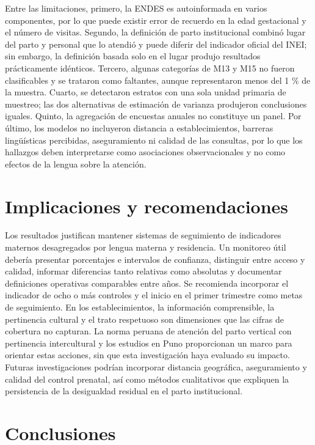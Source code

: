 \documentclass[
  spanish,
  letterpaper,
  conference]{IEEEtran}
\begin{document}
Entre las limitaciones, primero, la ENDES es autoinformada en varios
componentes, por lo que puede existir error de recuerdo en la edad
gestacional y el número de visitas. Segundo, la definición de parto
institucional combinó lugar del parto y personal que lo atendió y puede
diferir del indicador oficial del INEI; sin embargo, la definición
basada solo en el lugar produjo resultados prácticamente idénticos.
Tercero, algunas categorías de M13 y M15 no fueron clasificables y se
trataron como faltantes, aunque representaron menos del 1 \% de la
muestra. Cuarto, se detectaron estratos con una sola unidad primaria de
muestreo; las dos alternativas de estimación de varianza produjeron
conclusiones iguales. Quinto, la agregación de encuestas anuales no
constituye un panel. Por último, los modelos no incluyeron distancia a
establecimientos, barreras lingüísticas percibidas, aseguramiento ni
calidad de las consultas, por lo que los hallazgos deben interpretarse
como asociaciones observacionales y no como efectos de la lengua sobre
la atención.

\section{Implicaciones y
recomendaciones}\label{implicaciones-y-recomendaciones}

Los resultados justifican mantener sistemas de seguimiento de
indicadores maternos desagregados por lengua materna y residencia. Un
monitoreo útil debería presentar porcentajes e intervalos de confianza,
distinguir entre acceso y calidad, informar diferencias tanto relativas
como absolutas y documentar definiciones operativas comparables entre
años. Se recomienda incorporar el indicador de ocho o más controles y el
inicio en el primer trimestre como metas de seguimiento. En los
establecimientos, la información comprensible, la pertinencia cultural y
el trato respetuoso son dimensiones que las cifras de cobertura no
capturan. La norma peruana de atención del parto vertical con
pertinencia intercultural \citep{minsa2016} y los estudios en Puno
proporcionan un marco para orientar estas acciones, sin que esta
investigación haya evaluado su impacto. Futuras investigaciones podrían
incorporar distancia geográfica, aseguramiento y calidad del control
prenatal, así como métodos cualitativos que expliquen la persistencia de
la desigualdad residual en el parto institucional.

\section{Conclusiones}\label{conclusiones}
\end{document}
